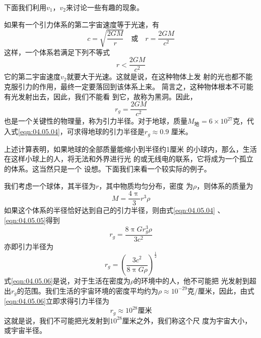 下面我们利用$  v _ 1 $，$ v _ 2 $来讨论一些有趣的现象。

如果有一个引力体系的第二宇宙速度等于光速，有
\begin{equation*}
c = \sqrt { \frac { 2 G M } { r } } \quad
\text{或} \quad
r = \frac { 2 G M } { c ^ { 2 } }
\end{equation*}
这样，一个体系若满足下列不等式
\begin{equation*}
	r < \frac { 2 G M } { c ^ { 2 } }
\end{equation*}
它的第二宇宙速度$ v_2 $就要大于光速。这就是说，在这种物体上发
射的光也都不能克服引力的作用，最终一定要落回到该体系上来。
简言之，这种物体根本不可能有光发射出去，因此，我们不能看
到它，故称为黑洞。因此，
\begin{equation}\label{eqn:04.05.04}
	r _ { g } = \frac { 2 G M } { c ^ { 2 } }
\end{equation}
也是一个关键性的物理量，称为引力半径。对于地球，质量$ M _ { \text{地} }= 6 \times 1 0 ^ { 2 7 }  $克，代入式\eqref{eqn:04.05.04}，可求得地球的引力半径是$  r _ { g } \approx 0 . 9  $
厘米。

上述计算表明，如果地球的全部质量能缩小到半径约1厘米
的小球内，那么，生活在这样小球上的人，将无法和外界进行光
的或无线电的联系，它将成为一个孤立的体系。这当然只是一个
设想。下面我们来看一个较实际的例子。

我们考虑一个球体，其半径为$ r $，其中物质均匀分布，密度
为$ \rho $，则体系的质量为
\begin{equation}\label{eqn:04.05.05}
	M = \frac { 4 \uppi } { 3 } r ^ { 3 } \rho
\end{equation}
如果这个体系的半径恰好达到自己的引力半径，则由式\eqref{eqn:04.05.04} 、\eqref{eqn:04.05.05}得到
\begin{equation*}
	r _ { g } = \frac { 8 \uppi G r _ { g } ^ { 3 } \rho } { 3 c ^ { 2 } }
\end{equation*}
亦即引力半径为
\begin{equation}\label{eqn:04.05.06}
	r _ { g } = \left( \frac { 3 c ^ { 2 } } { 8 \uppi G \rho } \right) ^ { \frac { 1 } { 2 } }
\end{equation}
式\eqref{eqn:04.05.06}是说，对于生活在密度为$ \rho $的环境中的人，他不可能把
光发射到超出$ r_g $的范围。我们生活的宇宙环境的密度平均约为$ \rho
\approx 10 ^ {-29}$克/厘米，因此，由式\eqref{eqn:04.05.06}立即求得引力半径为
\begin{equation*}
r _ g \approx 10 ^ {28} \text{厘米}
\end{equation*}
这就是说，我们不可能把光发射到$ 10 ^ {28} $厘米之外，我们称这个尺
度为宇宙大小，或宇宙半径。